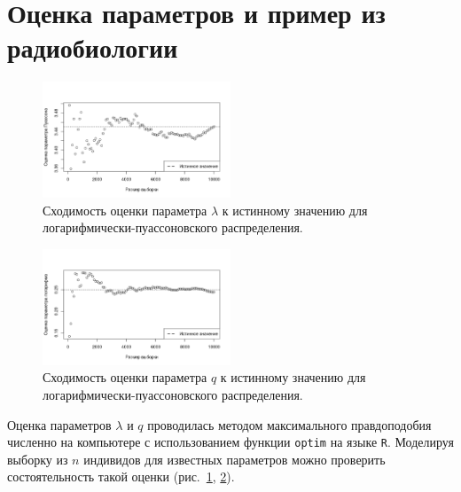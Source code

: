 \documentclass{math-mech-sci}
\begin{document}
	\section{Оценка параметров и пример из  радиобиологии }
	
	\begin{figure}[!h]
		\centering
		\includegraphics[width = 0.5\textwidth]{logpoislambda}
		\caption{Сходимость оценки параметра $\lambda$ к истинному значению для логарифмически-пуассоновского распределения.}
		\label{img:logpoislambda}
	\end{figure}
	
	\begin{figure}[!h]
		\centering
		\includegraphics[width = 0.5\textwidth]{logpoisq}
		\caption{Сходимость оценки параметра $q$ к истинному значению для логарифмически-пуассоновского распределения.}
		\label{img:logpoisq}
	\end{figure}
	
	Оценка параметров $\lambda$ и $q$ проводилась методом максимального правдоподобия численно на компьютере с использованием функции \verb|optim| на языке \verb|R|.
	Моделируя выборку из $n$ индивидов для известных параметров можно проверить состоятельность такой оценки (рис.~\ref{img:logpoislambda}, \ref{img:logpoisq}).
	
	
	
\end{document}
